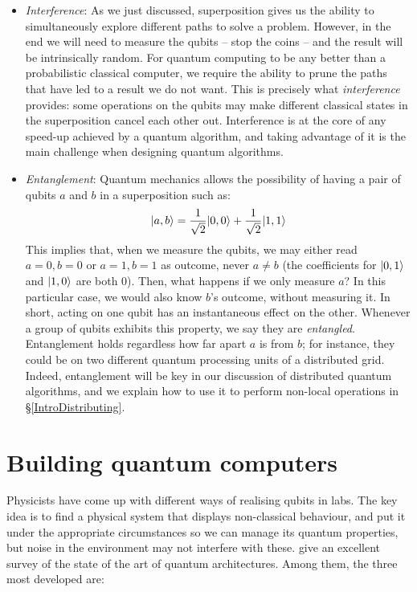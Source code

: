 \begin{itemize}
\item \textit{Interference}: As we just discussed, superposition gives us the ability to simultaneously explore different paths to solve a problem. However, in the end we will need to measure the qubits -- stop the coins -- and the result will be intrinsically random. For quantum computing to be any better than a probabilistic classical computer, we require the ability to prune the paths that have led to a result we do not want. This is precisely what \textit{interference} provides: some operations on the qubits may make different classical states in the superposition cancel each other out. Interference is at the core of any speed-up achieved by a quantum algorithm, and taking advantage of it is the main challenge when designing quantum algorithms.

\item \textit{Entanglement}: Quantum mechanics allows the possibility of having a pair of qubits \(a\) and \(b\) in a superposition such as: \[\vert a,b \rangle = \frac{1}{\sqrt{2}}\vert 0,0 \rangle + \frac{1}{\sqrt{2}}\vert 1,1 \rangle\] This implies that, when we measure the qubits, we may either read \(a=0, b=0\) or \(a=1, b=1\) as outcome, never \(a\not=b\) (the coefficients for \(\vert 0,1 \rangle\) and \(\vert 1,0 \rangle\) are both \(0\)). Then, what happens if we only measure \(a\)? In this particular case, we would also know \(b\)'s outcome, without measuring it. In short, acting on one qubit has an instantaneous effect on the other. Whenever a group of qubits exhibits this property, we say they are \textit{entangled}. Entanglement holds regardless how far apart \(a\) is from \(b\); for instance, they could be on two different quantum processing units of a distributed grid. Indeed, entanglement will be key in our discussion of distributed quantum algorithms, and we explain how to use it to perform non-local operations in \S\ref{IntroDistributing}.

\end{itemize}


\section{Building quantum computers}
\label{Hardware}

Physicists have come up with different ways of realising qubits in labs. The key idea is to find a physical system that displays non-classical behaviour, and put it under the appropriate circumstances so we can manage its quantum properties, but noise in the environment may not interfere with these. \citet{ArchitectureSurvey} give an excellent survey of the state of the art of quantum architectures. Among them, the three most developed are:

